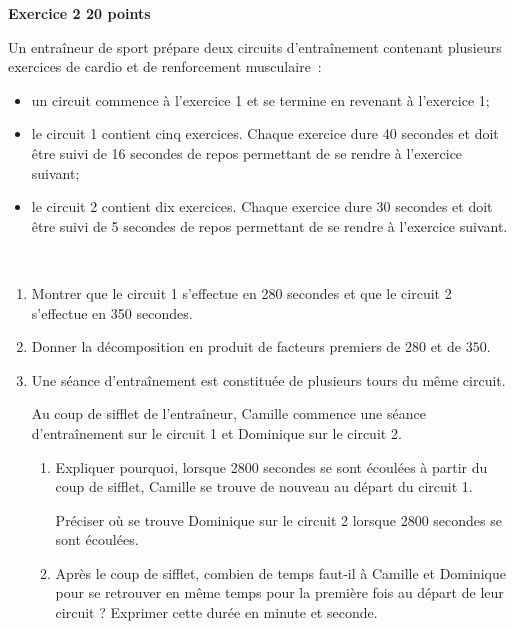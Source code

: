 \documentclass{article}
\begin{document}
\par\noindent
\textbf{Exercice 2 \hfill 20 points}\par
\medskip\noindent
Un entraîneur de sport prépare deux circuits d'entraînement contenant plusieurs
exercices de cardio et de renforcement musculaire~:
\begin{itemize}[label=\textbullet]
	\item un circuit commence à l'exercice 1 et se termine en revenant à l'exercice 1;
	\item le circuit 1 contient cinq exercices. Chaque exercice dure 40 secondes et doit être suivi de 16 secondes de repos permettant de se rendre à l'exercice suivant;
	\item le circuit 2 contient dix exercices. Chaque exercice dure 30 secondes et doit être suivi de 5 secondes de repos permettant de se rendre à l'exercice suivant.
\end{itemize}
\begin{center}
\hfill~
\end{center}
\begin{enumerate}
\item Montrer que le circuit 1 s'effectue en 280 secondes et que le circuit 2 s'effectue en 350 secondes.
\item Donner la décomposition en produit de facteurs premiers de $280$ et de $350$.
\item Une séance d'entraînement est constituée de plusieurs tours du même circuit.

Au coup de sifflet de l'entraîneur, Camille commence une séance d'entraînement sur le circuit 1 et Dominique sur le circuit 2.

	\begin{enumerate}
		\item Expliquer pourquoi, lorsque \num{2800} secondes se sont écoulées à partir du coup de sifflet, Camille se trouve de nouveau au départ du circuit 1.

		Préciser où se trouve Dominique sur le circuit 2 lorsque \num{2800} secondes se sont écoulées.

		\item Après le coup de sifflet, combien de temps faut-il à Camille et Dominique pour se retrouver en même temps pour la première fois au départ de leur circuit ? Exprimer cette durée en minute et seconde.
	\end{enumerate}
\end{enumerate}
\end{document}
